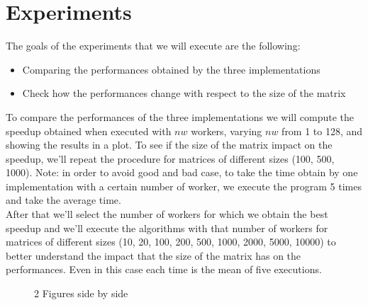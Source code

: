 \documentclass{article}
\begin{document}
	\section{Experiments}
	The goals of the experiments that we will execute are the following: 
	\begin{itemize}
		\item Comparing the performances obtained by the three implementations 
		\item Check how the performances change with respect to the size of the matrix
	\end{itemize}
	To compare the performances of the three implementations we will compute the speedup obtained when executed with $nw$ workers, varying $nw$ from 1 to 128, and showing the results in a plot. To see if the size of the matrix impact on the speedup, we'll repeat the procedure for matrices of different sizes (100, 500, 1000). Note: in order to avoid good and bad case, to take the time obtain by one implementation with a certain number of worker, we execute the program 5 times and take the average time. \\
	After that we'll select the number of workers for which we obtain the best speedup and we'll execute the algorithms with that number of workers for matrices of different sizes (10, 20, 100, 200, 500, 1000, 2000, 5000, 10000) to better understand the impact that the size of the matrix has on the performances. Even in this case each time is the mean of five executions.
	\begin{figure}[H]
		\centering
		\qquad
		\caption{2 Figures side by side}%
		\label{fig:example}%
	\end{figure}
		
\end{document}
